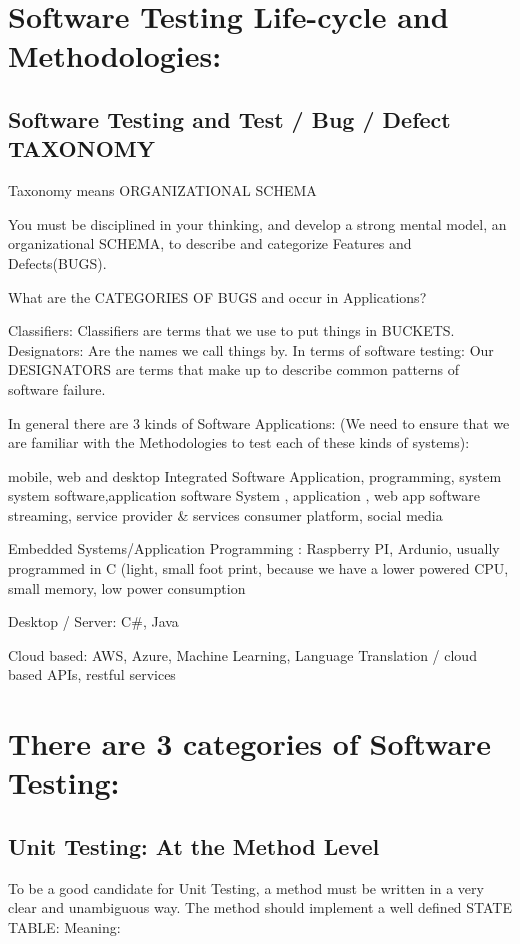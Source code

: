 \section{Software Testing Life-cycle and Methodologies:}

\subsection{Software Testing and Test / Bug / Defect TAXONOMY}

Taxonomy means ORGANIZATIONAL SCHEMA

You must be disciplined in your thinking, and develop a strong mental model, an organizational SCHEMA, to describe and categorize Features and Defects(BUGS).

What are the CATEGORIES OF BUGS and occur in Applications?

Classifiers: Classifiers are terms that we use to put things in BUCKETS.
Designators: Are the names we call things by. In terms of software testing: Our DESIGNATORS are terms that make up to describe common patterns of software failure.

In general there are 3 kinds of Software Applications: (We need to ensure that we are familiar with the Methodologies to test each of these kinds of systems):

mobile, web and desktop
Integrated Software
Application, programming, system
system software,application software
System , application  , web app software
streaming, service provider & services consumer platform, social media

Embedded Systems/Application Programming : Raspberry PI, Ardunio, usually programmed in C (light, small foot print, because we have a lower powered CPU, small memory, low power consumption

Desktop / Server: C#, Java

Cloud based: AWS, Azure, Machine Learning, Language Translation / cloud based APIs, restful services

\section{There are 3 categories of Software Testing: }
\subsection{Unit Testing: At the Method Level}
To be a good candidate for Unit Testing, a method must be written in a very clear and unambiguous way.
The method should implement a well defined STATE TABLE: Meaning:

